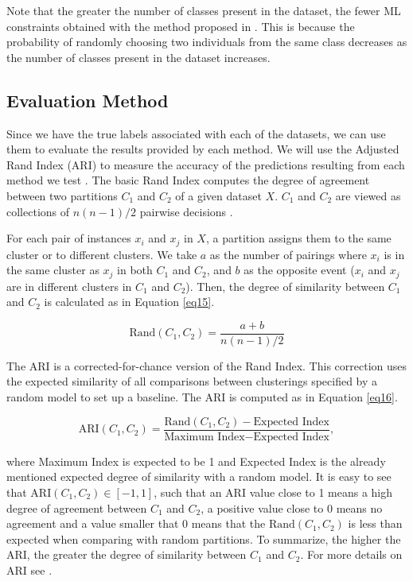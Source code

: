 \documentclass[review]{elsarticle}
\begin{document}
Note that the greater the number of classes present in the dataset, the fewer ML constraints obtained with the method proposed in \cite{wagstaff2001constrained}. This is because the probability of randomly choosing two individuals from the same class decreases as the number of classes present in the dataset increases.

\clearpage

\subsection{Evaluation Method} \label{sec:EvalMet}

Since we have the true labels associated with each of the datasets, we can use them to evaluate the results provided by each method. We will use the Adjusted Rand Index (ARI) to measure the accuracy of the predictions resulting from each method we test \cite{hubert1985comparing}. The basic Rand Index computes the degree of agreement between two partitions $C_1$ and $C_2$ of a given dataset $X$. $C_1$ and $C_2$ are viewed as collections of $n(n - 1)/2$ pairwise decisions \cite{rand1971objective}.

For each pair of instances $x_i$ and $x_j$ in $X$, a partition assigns them to the same cluster or to different clusters. We take $a$ as the number of pairings where $x_i$ is in the same cluster as $x_j$ in both $C_1$ and $C_2$, and $b$ as the opposite event ($x_i$ and $x_j$ are in different clusters in $C_1$ and $C_2$). Then, the degree of similarity between $C_1$ and $C_2$ is calculated as in Equation \eqref{eq15}.

\begin{equation}
\text{Rand}(C_1, C_2) = \frac{a + b}{n(n - 1)/2}
\label{eq15}
\end{equation}

The ARI is a corrected-for-chance version of the Rand Index. This correction uses the expected similarity of all comparisons between clusterings specified by a random model to set up a baseline. The ARI is computed as in Equation \eqref{eq16}.

\begin{equation}
\text{ARI}(C_1, C_2) = \frac{\text{Rand}(C_1, C_2) - \text{Expected Index}}{\text{Maximum Index} - \text{Expected Index}},
\label{eq16}
\end{equation}

\noindent where Maximum Index is expected to be 1 and Expected Index is the already mentioned expected degree of similarity with a random model. It is easy to see that $\text{ARI}(C_1, C_2) \in [-1,1]$, such that an ARI value close to 1 means a high degree of agreement between $C_1$ and $C_2$, a positive value close to 0 means no agreement and a value smaller that 0 means that the $\text{Rand}(C_1, C_2)$ is less than expected when comparing with random partitions. To summarize, the higher the ARI, the greater the degree of similarity between $C_1$ and $C_2$. For more details on ARI see \cite{hubert1985comparing}.
\end{document}
